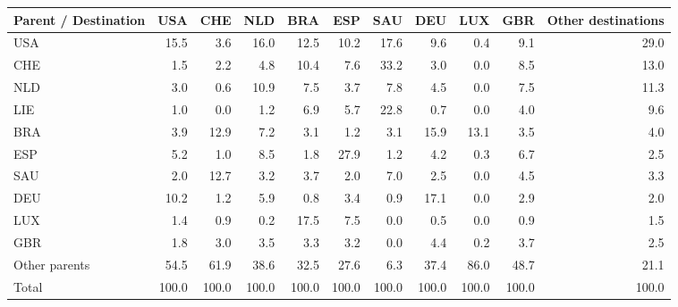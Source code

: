 \begin{tabular}{lrrrrrrrrrr}
\toprule
Parent / Destination & USA & CHE & NLD & BRA & ESP & SAU & DEU & LUX & GBR & Other destinations \\
\midrule
USA & 15.5 & 3.6 & 16.0 & 12.5 & 10.2 & 17.6 & 9.6 & 0.4 & 9.1 & 29.0 \\
CHE & 1.5 & 2.2 & 4.8 & 10.4 & 7.6 & 33.2 & 3.0 & 0.0 & 8.5 & 13.0 \\
NLD & 3.0 & 0.6 & 10.9 & 7.5 & 3.7 & 7.8 & 4.5 & 0.0 & 7.5 & 11.3 \\
LIE & 1.0 & 0.0 & 1.2 & 6.9 & 5.7 & 22.8 & 0.7 & 0.0 & 4.0 & 9.6 \\
BRA & 3.9 & 12.9 & 7.2 & 3.1 & 1.2 & 3.1 & 15.9 & 13.1 & 3.5 & 4.0 \\
ESP & 5.2 & 1.0 & 8.5 & 1.8 & 27.9 & 1.2 & 4.2 & 0.3 & 6.7 & 2.5 \\
SAU & 2.0 & 12.7 & 3.2 & 3.7 & 2.0 & 7.0 & 2.5 & 0.0 & 4.5 & 3.3 \\
DEU & 10.2 & 1.2 & 5.9 & 0.8 & 3.4 & 0.9 & 17.1 & 0.0 & 2.9 & 2.0 \\
LUX & 1.4 & 0.9 & 0.2 & 17.5 & 7.5 & 0.0 & 0.5 & 0.0 & 0.9 & 1.5 \\
GBR & 1.8 & 3.0 & 3.5 & 3.3 & 3.2 & 0.0 & 4.4 & 0.2 & 3.7 & 2.5 \\
Other parents & 54.5 & 61.9 & 38.6 & 32.5 & 27.6 & 6.3 & 37.4 & 86.0 & 48.7 & 21.1 \\
\midrule
Total & 100.0 & 100.0 & 100.0 & 100.0 & 100.0 & 100.0 & 100.0 & 100.0 & 100.0 & 100.0 \\
\bottomrule
\end{tabular}
